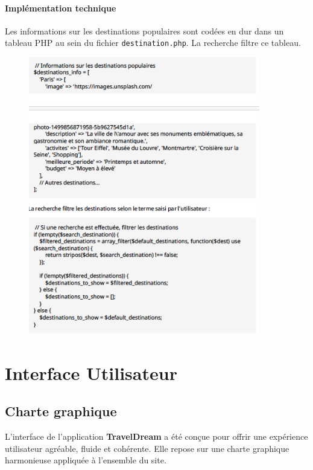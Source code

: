 \documentclass[a4paper,12pt]{article}
\begin{document}
\paragraph{Implémentation technique}
Les informations sur les destinations populaires sont codées en dur dans un tableau PHP au sein du fichier \texttt{destination.php}. La recherche filtre ce tableau.
\begin{figure}[H]
  \centering
  \includegraphics[width=0.9\textwidth]{capture8.png}
\end{figure}

\section{Interface Utilisateur}

\subsection{Charte graphique}
L’interface de l’application \textbf{TravelDream} a été conçue pour offrir une expérience utilisateur agréable, fluide et cohérente. Elle repose sur une charte graphique harmonieuse appliquée à l’ensemble du site.
\end{document}
